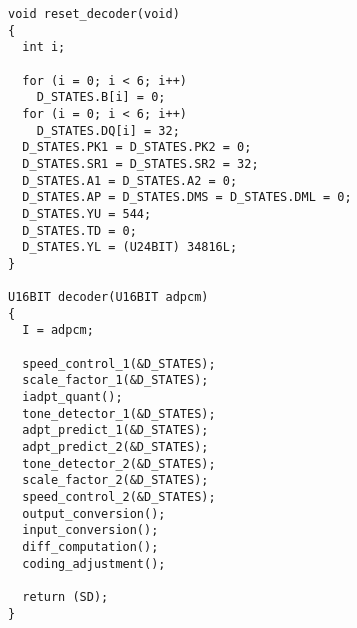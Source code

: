 \begin{verbatim}
void reset_decoder(void)
{
  int i;

  for (i = 0; i < 6; i++)
    D_STATES.B[i] = 0;
  for (i = 0; i < 6; i++)
    D_STATES.DQ[i] = 32;
  D_STATES.PK1 = D_STATES.PK2 = 0;
  D_STATES.SR1 = D_STATES.SR2 = 32;
  D_STATES.A1 = D_STATES.A2 = 0;
  D_STATES.AP = D_STATES.DMS = D_STATES.DML = 0;
  D_STATES.YU = 544;
  D_STATES.TD = 0;
  D_STATES.YL = (U24BIT) 34816L;
}

U16BIT decoder(U16BIT adpcm)
{
  I = adpcm;

  speed_control_1(&D_STATES);
  scale_factor_1(&D_STATES);
  iadpt_quant();
  tone_detector_1(&D_STATES);
  adpt_predict_1(&D_STATES);
  adpt_predict_2(&D_STATES);
  tone_detector_2(&D_STATES);
  scale_factor_2(&D_STATES);
  speed_control_2(&D_STATES);
  output_conversion();
  input_conversion();
  diff_computation();
  coding_adjustment();

  return (SD);
}
\end{verbatim}
